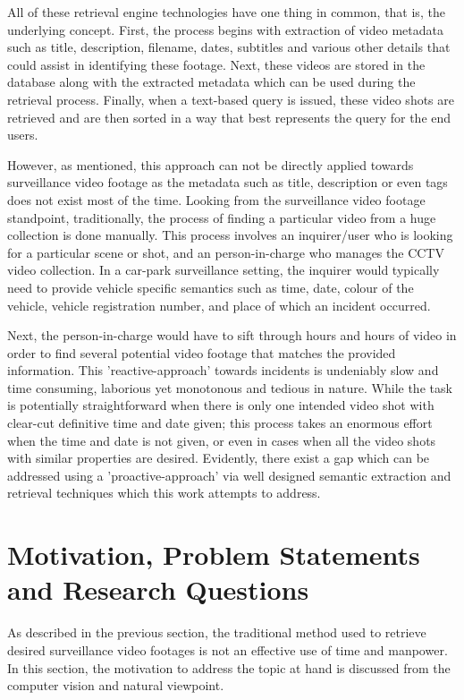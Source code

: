 All of these retrieval engine technologies have one thing in common, that is, the underlying concept. First, the process begins with extraction of video metadata such as title, description, filename, dates, subtitles and various other details that could assist in identifying these footage. Next, these videos are stored in the database along with the extracted metadata which can be used during the retrieval process. Finally, when a text-based query is issued, these video shots are retrieved and are then sorted in a way that best represents the query for the end users.

However, as mentioned, this approach can not be directly applied towards surveillance video footage as the metadata such as title, description or even tags does not exist most of the time. Looking from the surveillance video footage standpoint, traditionally, the process of finding a particular video from a huge collection is done manually. This process involves an inquirer/user who is looking for a particular scene or shot, and an person-in-charge who manages the CCTV video collection. In a car-park surveillance setting, the inquirer would typically need to provide vehicle specific semantics such as time, date, colour of the vehicle, vehicle registration number, and place of which an incident occurred. %

Next, the person-in-charge would have to sift through hours and hours of video in order to find several potential video footage that matches the provided information. This 'reactive-approach' towards incidents is undeniably slow and time consuming, laborious yet monotonous and tedious in nature. While the task is potentially straightforward when there is only one intended video shot with clear-cut definitive time and date given; this process takes an enormous effort when the time and date is not given, or even in cases when all the video shots with similar properties are desired. Evidently, there exist a gap which can be addressed using a 'proactive-approach' via well designed semantic extraction and retrieval techniques which this work attempts to address.

\section{Motivation, Problem Statements and Research Questions}

As described in the previous section, the traditional method used to retrieve desired surveillance video footages is not an effective use of time and manpower. In this section, the motivation to address the topic at hand is discussed from the computer vision and natural viewpoint.

